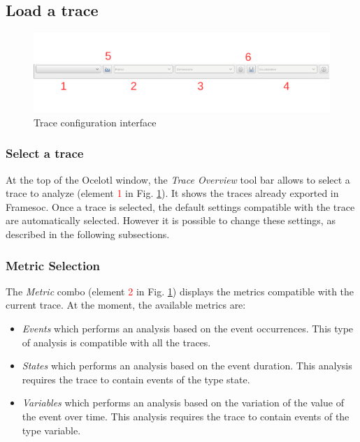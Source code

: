 \documentclass[twoside]{article}
\begin{document}
\begin{sloppypar}
\subsection{Load a trace}
\begin{figure}[h!]
	\centering
	\includegraphics[width=\textwidth]{images/traceSelection_labeled.pdf}
	\caption{Trace configuration interface}
	\label{traceConf}
\end{figure}

\subsubsection{Select a trace}

At the top of the Ocelotl window, the \textit{Trace Overview} tool bar allows to select a trace to analyze (element \textcolor{red}{1} in Fig. \ref{traceConf}). It shows the traces already exported in Framesoc. Once a trace is selected, the default settings compatible with the trace are automatically selected. However it is possible to change these settings, as described in the following subsections. 

\subsubsection{Metric Selection}
The \textit{Metric} combo (element \textcolor{red}{2} in Fig. \ref{traceConf}) displays the metrics compatible with the current trace.
At the moment, the available metrics are: 
\begin{itemize}
	\item \textit{Events} which performs an analysis based on the event occurrences. This type of analysis is compatible with all the traces.
	\item \textit{States} which performs an analysis based on the event duration. This analysis requires the trace to contain events of the type state.
	\item \textit{Variables} which performs an analysis based on the variation of the value of the event over time. This analysis requires the trace to contain events of the type variable.
\end{itemize}


\end{sloppypar}
\end{document}
